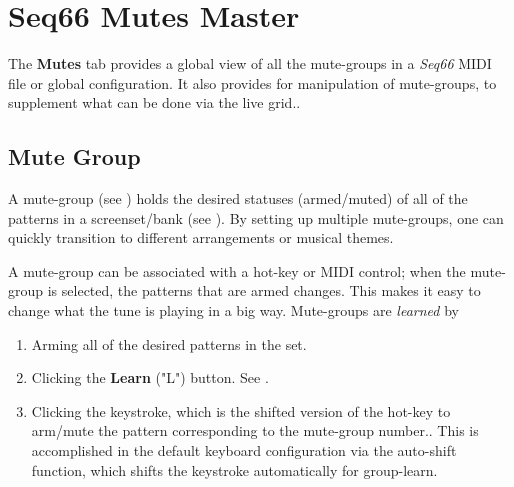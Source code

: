 %
%
%

\section{Seq66 Mutes Master}
\label{sec:mutes_master}

   The \textbf{Mutes} tab provides a global view of all the mute-groups
   in a \textsl{Seq66} MIDI file or global configuration.
   It also provides for manipulation of mute-groups, to supplement
   what can be done via the live grid..

\subsection{Mute Group}
\label{sec:mutes_mute_group}

   A mute-group
   (see )
   holds the desired statuses (armed/muted) of all
   of the patterns in a screenset/bank
   (see ).
   By setting up multiple mute-groups,
   one can quickly transition to different arrangements or
   musical themes.

   A mute-group can be associated with a hot-key or MIDI control;
   when the mute-group is selected, the patterns that are armed changes.
   This makes it easy to change what the tune is playing in a big way.
   Mute-groups are \textsl{learned} by

   \begin{enumerate}
      \item Arming all of the desired patterns in the set.
      \item Clicking the \textbf{Learn} ("L") button.
         See .
      \item Clicking the keystroke, which is the shifted version
         of the hot-key to arm/mute the pattern corresponding to
         the mute-group number..
         This is accomplished in the default keyboard configuration via the
         auto-shift function, which shifts the keystroke automatically
         for group-learn.
   \end{enumerate}

